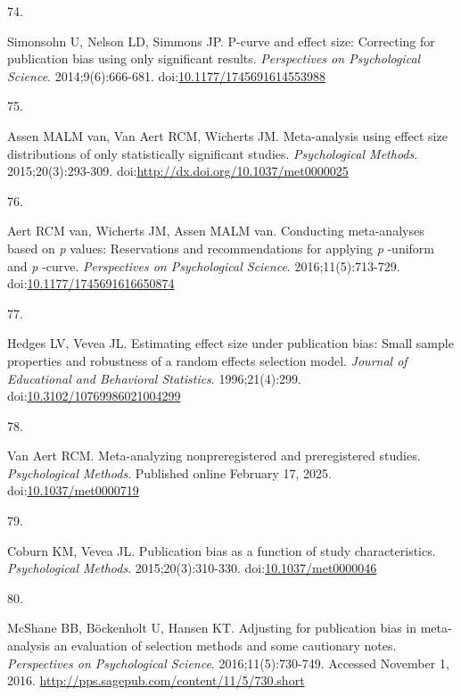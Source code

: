 \documentclass[
  american,
  man, donotrepeattitle,floatsintext]{apa7}
\newlength{\cslhangindent}
\newlength{\csllabelwidth}
\newenvironment{CSLReferences}[2] %
 {\begin{list}{}{%
  \setlength{\itemindent}{0pt}
  \setlength{\leftmargin}{0pt}
  \setlength{\parsep}{0pt}
  \ifodd #1
   \setlength{\leftmargin}{\cslhangindent}
   \setlength{\itemindent}{-1\cslhangindent}
  \fi
  \setlength{\itemsep}{#2\baselineskip}}}
 {\end{list}}
\newcommand{\CSLLeftMargin}[1]{\parbox[t]{\csllabelwidth}{\strut#1\strut}}
\newcommand{\CSLRightInline}[1]{\parbox[t]{\linewidth - \csllabelwidth}{\strut#1\strut}}
\begin{document}
\begin{CSLReferences}{0}{1}
\CSLLeftMargin{74. }%
\CSLRightInline{Simonsohn U, Nelson LD, Simmons JP. P-curve and effect size: Correcting for publication bias using only significant results. \emph{Perspectives on Psychological Science}. 2014;9(6):666-681. doi:\href{https://doi.org/10.1177/1745691614553988}{10.1177/1745691614553988}}

\CSLLeftMargin{75. }%
\CSLRightInline{Assen MALM van, Van Aert RCM, Wicherts JM. {Meta-analysis using effect size distributions of only statistically significant studies}. \emph{Psychological Methods}. 2015;20(3):293-309. doi:\url{http://dx.doi.org/10.1037/met0000025}}

\CSLLeftMargin{76. }%
\CSLRightInline{Aert RCM van, Wicherts JM, Assen MALM van. Conducting meta-analyses based on \emph{p} values: Reservations and recommendations for applying \emph{p} -uniform and \emph{p} -curve. \emph{Perspectives on Psychological Science}. 2016;11(5):713-729. doi:\href{https://doi.org/10.1177/1745691616650874}{10.1177/1745691616650874}}

\CSLLeftMargin{77. }%
\CSLRightInline{Hedges LV, Vevea JL. {Estimating effect size under publication bias: Small sample properties and robustness of a random effects selection model}. \emph{Journal of Educational and Behavioral Statistics}. 1996;21(4):299. doi:\href{https://doi.org/10.3102/10769986021004299}{10.3102/10769986021004299}}

\CSLLeftMargin{78. }%
\CSLRightInline{Van Aert RCM. Meta-analyzing nonpreregistered and preregistered studies. \emph{Psychological Methods}. Published online February 17, 2025. doi:\href{https://doi.org/10.1037/met0000719}{10.1037/met0000719}}

\CSLLeftMargin{79. }%
\CSLRightInline{Coburn KM, Vevea JL. {Publication bias as a function of study characteristics}. \emph{Psychological Methods}. 2015;20(3):310-330. doi:\href{https://doi.org/10.1037/met0000046}{10.1037/met0000046}}

\CSLLeftMargin{80. }%
\CSLRightInline{McShane BB, Böckenholt U, Hansen KT. Adjusting for publication bias in meta-analysis an evaluation of selection methods and some cautionary notes. \emph{Perspectives on Psychological Science}. 2016;11(5):730-749. Accessed November 1, 2016. \url{http://pps.sagepub.com/content/11/5/730.short}}

\end{CSLReferences}

\endgroup
\end{document}

